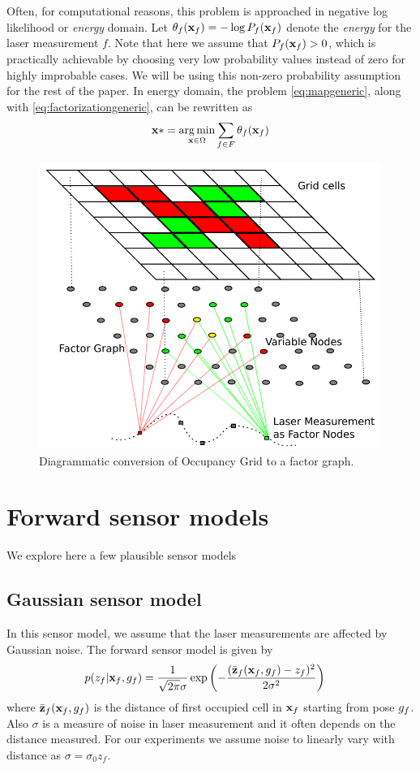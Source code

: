 \documentclass[letterpaper, 10 pt, conference]{ieeeconf} %
\DeclareMathOperator*{\argmin}{arg\,min}
\begin{document}
Often, for computational reasons, this problem is approached in negative log
likelihood or \emph{energy} domain. Let 
$\theta_f(\mathbf{x}_f) = - \log P_f(\mathbf{x}_f)$ 
denote the \emph{energy} for the laser measurement $f$. Note that here we
assume that $P_f(\mathbf{x}_f) > 0$, which is practically achievable by
choosing very low probability values instead of zero for highly improbable
cases. We will be using this non-zero probability assumption for the rest of the paper. 
In energy domain, the problem \eqref{eq:mapgeneric}, along with
\eqref{eq:factorizationgeneric}, can be rewritten as
\begin{align}
  \map* = \argmin_{\map \in \Omega} \sum_{f \in F} \theta_f(\map_f)
\end{align}
\begin{figure}
  \includegraphics[width=\columnwidth]{../figures/factorgraph/factorgraph.pdf}
  \caption{Diagrammatic conversion of Occupancy Grid to a factor graph.}
  \label{fig:factor-graph}
\end{figure}

\section{Forward sensor models}
We explore here a few plausible sensor models
\subsection{Gaussian sensor model}
\newcommand{\actz}{\bar{\measurements}_f(\map_f, \pose_f)}
In this sensor model, we assume that the laser measurements are affected by Gaussian noise. The forward sensor model is given by
\begin{align}
  p(\meas_f|\map_f, \pose_f) &=
  \frac{1}{\sqrt{2\pi}\sigma}\exp\left(-\frac{(\actz - \meas_f)^2}{2\sigma^2}\right)
  \label{eq:gaussiansensormodel}
\end{align}
where $\actz$ is the distance of first occupied cell in $\mathbf{x}_f$ starting from pose $g_f$. Also $\sigma$ is a measure of noise in laser measurement and it often depends on the distance measured. For our experiments we assume noise to linearly vary with distance as $\sigma = \sigma_0z_f$. 
\end{document}
